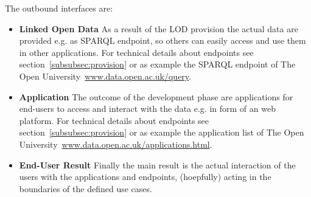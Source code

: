 The outbound interfaces are:

\begin{itemize}
	\item \textbf{Linked Open Data}\newline
	As a result of the LOD provision the actual data are provided e.g. as SPARQL endpoint, so others can easily access and use them in other applications. For technical details about endpoints see section~\ref{subsubsec:provision} or as example the SPARQL endpoint of The Open University~\url{www.data.open.ac.uk/query}.
	\item \textbf{Application}\newline
	The outcome of the development phase are applications for end-users to access and interact with the data e.g. in form of an web platform. For technical details about endpoints see section~\ref{subsubsec:provision} or as example the application list of The Open University~\url{www.data.open.ac.uk/applications.html}.
	\item \textbf{End-User Result}\newline
	Finally the main result is the actual interaction of the users with the applications and endpoints, (hoepfully) acting in the boundaries of the defined use cases.
\end{itemize}

\newpage

